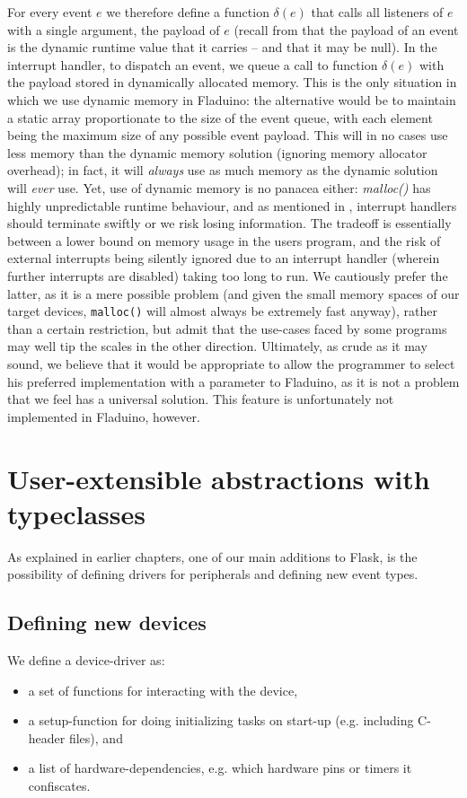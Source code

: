 \documentclass[a4paper, oneside, final]{memoir}
\let\Fref\undefined
\begin{document}
For every event $e$ we therefore define a function $\delta(e)$ that
calls all listeners of $e$ with a single argument, the payload of $e$
(recall from \Fref{sec:events_design} that the payload of an event is
the dynamic runtime value that it carries -- and that it may be null).
In the interrupt handler, to dispatch an event, we queue a call to
function $\delta(e)$ with the payload stored in dynamically allocated
memory.  This is the only situation in which we use dynamic memory in
Fladuino: the alternative would be to maintain a static array
proportionate to the size of the event queue, with each element being
the maximum size of any possible event payload.  This will in no cases
use less memory than the dynamic memory solution (ignoring memory
allocator overhead); in fact, it will \textit{always} use as much
memory as the dynamic solution will \textit{ever} use.  Yet, use of
dynamic memory is no panacea either: \textit{malloc()} has highly
unpredictable runtime behaviour, and as mentioned in
\Fref{sec:dataflowevaluationstrategy}, interrupt handlers should
terminate swiftly or we risk losing information.  The tradeoff is
essentially between a lower bound on memory usage in the users
program, and the risk of external interrupts being silently ignored
due to an interrupt handler (wherein further interrupts are disabled)
taking too long to run.  We cautiously prefer the latter, as it is a
mere possible problem (and given the small memory spaces of our target
devices, \texttt{malloc()} will almost always be extremely fast
anyway), rather than a certain restriction, but admit that the
use-cases faced by some programs may well tip the scales in the other
direction.  Ultimately, as crude as it may sound, we believe that it
would be appropriate to allow the programmer to select his preferred
implementation with a parameter to Fladuino, as it is not a problem
that we feel has a universal solution.  This feature is unfortunately
not implemented in Fladuino, however.

\section{User-extensible abstractions with typeclasses}
As explained in earlier chapters, one of our main additions to Flask,
is the possibility of defining drivers for peripherals and defining
new event types.

\subsection{Defining new devices}
We define a device-driver as:
\begin{itemize}
\item a set of functions for interacting with the device,
\item a setup-function for doing initializing tasks on start-up
  (e.g. including C-header files), and
\item a list of hardware-dependencies, e.g. which hardware pins or
  timers it confiscates.
\end{itemize}
\end{document}
